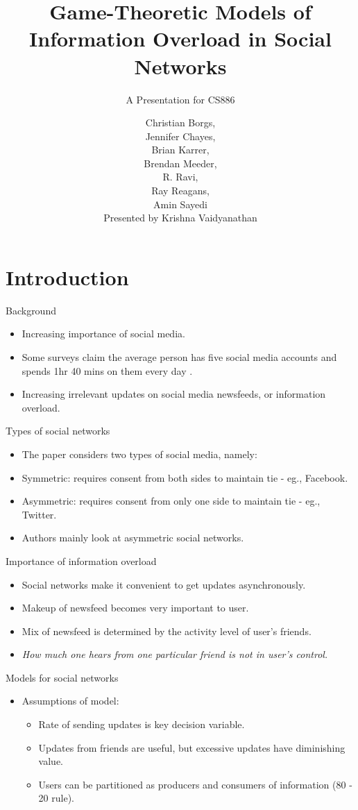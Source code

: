 \documentclass[aspectratio=169]{beamer}
\title[Game-Theoretic Models]{Game-Theoretic Models of Information Overload in Social Networks}
\subtitle{A Presentation for CS886}
\author[Presented by Krishna Vaidyanathan]{Christian Borgs,\\Jennifer
    Chayes,\\Brian Karrer,\\Brendan Meeder,\\R. Ravi,\\Ray Reagans,\\Amin
    Sayedi\\\vspace{1em}Presented by Krishna Vaidyanathan}
\newcommand{\bi}{\begin{itemize}}
\newcommand{\ei}{\end{itemize}}
\begin{document}
\frame[plain]{\titlepage}

\frame[plain]{\tableofcontents}

\section{Introduction}
\begin{frame}{Background}
    \bi
\item Increasing importance of social media.
    \pause
\item Some surveys claim the average person has five social media accounts and
    spends 1hr 40 mins on them every day \cite{telegraph15}.
    \pause
\item Increasing irrelevant updates on social media newsfeeds, or information overload.
    \ei
\end{frame}

\begin{frame}{Types of social networks}
    \bi
\item The paper considers two types of social media, namely:
    \pause
\item Symmetric: requires consent from both sides to maintain tie - eg.,
    Facebook.
    \pause
\item Asymmetric: requires consent from only one side to maintain tie - eg.,
    Twitter.
    \pause
\item Authors mainly look at asymmetric social networks.
    \ei
\end{frame}

\begin{frame}{Importance of information overload}
    \bi
\item Social networks make it convenient to get updates asynchronously.
    \pause
\item Makeup of newsfeed becomes very important to user.
    \pause
\item Mix of newsfeed is determined by the activity level of user's friends.
    \pause
\item \textit{How much one hears from one particular friend is not in user's 
        control.}
    \ei
\end{frame}

\begin{frame}{Models for social networks}
    \bi
\item  Assumptions of model:
    \pause
    \bi
\item Rate of sending updates is key decision variable.
    \pause
\item Updates from friends are useful, but excessive updates have diminishing
    value.
    \pause
\item Users can be partitioned as producers and consumers of information (80 -
    20 rule).
    \ei
    \ei
\end{frame}
\end{document}
